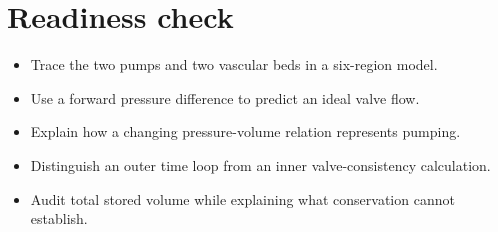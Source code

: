 \documentclass[11pt,letterpaper]{article}
\theoremstyle{definition}\newtheorem{definition}{Definition}\newtheorem{example}{Example}
\numberwithin{equation}{section}
\begin{document}
\section*{Readiness check}
\begin{itemize}
\item Trace the two pumps and two vascular beds in a six-region model.
\item Use a forward pressure difference to predict an ideal valve flow.
\item Explain how a changing pressure-volume relation represents pumping.
\item Distinguish an outer time loop from an inner valve-consistency calculation.
\item Audit total stored volume while explaining what conservation cannot establish.
\end{itemize}
\end{document}
